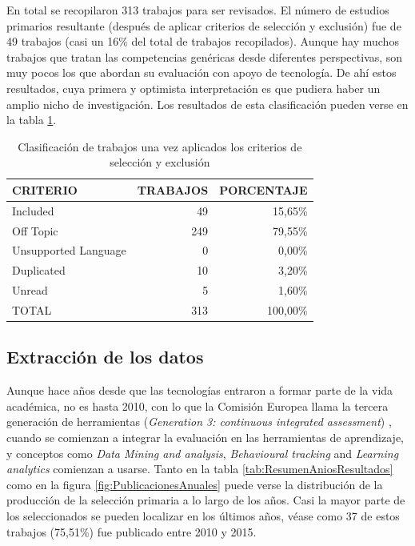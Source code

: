En total se recopilaron 313 trabajos para ser revisados. El número de estudios primarios resultante (después de aplicar criterios de selección y exclusión) fue de 49 trabajos (casi un 16\% del total de trabajos recopilados). Aunque hay muchos trabajos que tratan las competencias genéricas desde diferentes perspectivas, son muy pocos los que abordan su evaluación con apoyo de tecnología. De ahí estos resultados, cuya primera y optimista interpretación es que pudiera haber un amplio nicho de investigación. Los resultados de esta clasificación pueden verse en la tabla \ref{tab:ResumenSelecccionResultados}.

\begin{table}
  \begin{center}
  \begin{tabular}{| m{4cm} | r | r |}
    \hline
    CRITERIO & TRABAJOS & PORCENTAJE\\
    \hline
    \hline 
    Included & 49 & 15,65\% \\
    \hline
    Off Topic & 249 & 79,55\% \\
    \hline
    Unsupported Language & 0 & 0,00\% \\
    \hline
    Duplicated & 10 & 3,20\% \\
    \hline
    Unread & 5 & 1,60\% \\
    \hline
    TOTAL & 313 & 100,00\% \\
    \hline
  \end{tabular}
\end{center}
\caption{Clasificación de trabajos una vez aplicados los criterios de selección y exclusión}
\label{tab:ResumenSelecccionResultados}
\end{table} 

\subsection{Extracción de los datos}

Aunque hace años desde que las tecnologías entraron a formar parte de la vida académica, no es hasta 2010, con lo que la Comisión Europea llama la tercera generación de herramientas (\emph{Generation 3: continuous integrated assessment}) \cite{Redecker:2013}, cuando se comienzan a integrar la evaluación en las herramientas de aprendizaje, y conceptos como \emph{Data Mining and analysis}, \emph{Behavioural tracking} and \emph{Learning analytics} comienzan a usarse. Tanto en la tabla \ref{tab:ResumenAniosResultados} como en la figura \ref{fig:PublicacionesAnuales} puede verse la distribución de la producción de la selección primaria a lo largo de los años. Casi la mayor parte de los seleccionados se pueden localizar en los últimos años, véase como 37 de estos trabajos (75,51\%) fue publicado entre 2010 y 2015.

